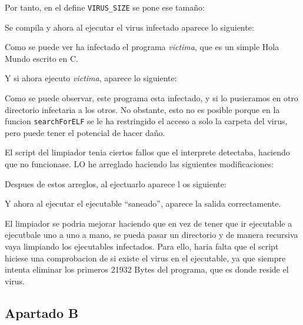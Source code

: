 \documentclass{article}
\begin{document}
Por tanto, en el define \verb|VIRUS_SIZE| se pone ese tamaño:


Se compila y ahora al ejecutar el virus infectado aparece lo siguiente:


Como se puede ver ha infectado el programa \textit{victima}, que es un simple Hola Mundo escrito en C.

Y si ahora ejecuto \textit{victima}, aparece lo siguiente:


Como se puede observar, este programa esta infectado, y si lo pusieramos en otro directorio infectaria a los otros. No obstante, esto no es posible porque en la funcion \verb|searchForELF| se le ha restringido el acceso a solo la carpeta del virus, pero puede tener el potencial de hacer daño.



El script del limpiador tenia ciertos fallos que el interprete detectaba, haciendo que no funcionase. LO he arreglado haciendo las siguientes modificaciones: 


Despues de estos arreglos, al ejectuarlo aparece l os siguiente:


Y ahora al ejecutar el ejecutable ``saneado'', aparece la salida correctamente.

El limpiador se podria mejorar haciendo que en vez de tener que ir ejecutable a ejecutbale uno a uno a mano, se pueda pasar un directorio y de manera recursiva vaya limpiando los ejecutables infectados. Para ello, haria falta que el script hiciese una comprobacion de si existe el virus en el ejecutable, ya que siempre intenta eliminar los primeros 21932 Bytes del programa, que es donde reside el virus.

\subsection*{Apartado B}
\end{document}
